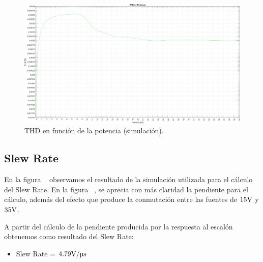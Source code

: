 \clearpage

\begin{figure}[H]
    \centering
    \includegraphics[height=0.66 \textwidth, angle=90]{./img/simulaciones/THD/THD_vs_power_sim.png}
    \caption{THD en función de la potencia (simulación).}
    \label{fig:THD_vs_power_sim}
\end{figure}

\clearpage

\subsection{Slew Rate}

\par En la figura ~ observamos el resultado de la simulación utilizada para el cálculo del Slew Rate. En la figura  ~, se aprecia con más claridad la pendiente para el cálculo, además del efecto que produce la conmutación entre las fuentes de $15 \si[per-mode=symbol]{\volt}$ y $35 \si[per-mode=symbol]{\volt}$.

\par A partir del cálculo de la pendiente producida por la respuesta al escalón obtenemos como resultado del Slew Rate:

\begin{itemize}
    \item Slew Rate = $4.79 \si[per-mode=symbol]{\volt\per\micro\second}$
\end{itemize}

\vfill

\clearpage

